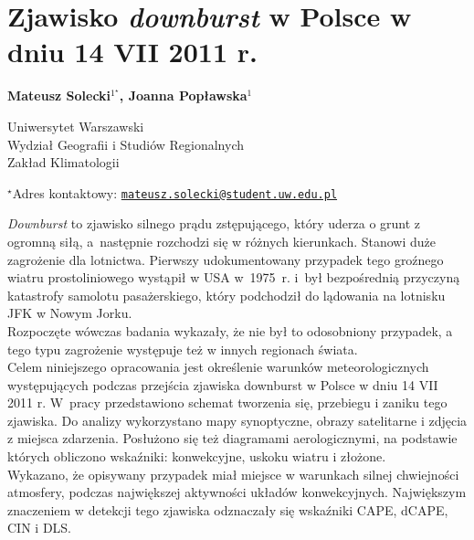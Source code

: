 \documentclass[\main/boa.tex]{subfiles}
\begin{document}
\section{Zjawisko \emph{downburst} w Polsce w dniu 14 VII 2011 r.}

\begin{center}
  {\bf {} Mateusz Solecki$^{1^\star}$,  Joanna Popławska$^{1}$}
\end{center}

\vskip 0.3cm

\begin{affiliations}
\begin{enumerate}
\begin{minipage}{0.915\textwidth}
\centering
\item Uniwersytet Warszawski\\ Wydział Geografii i Studiów Regionalnych\\ Zakład Klimatologii\\[-2pt]
\end{minipage}
\end{enumerate}
$^\star$Adres kontaktowy: \href{mailto:mateusz.solecki@student.uw.edu.pl}{\nolinkurl{mateusz.solecki@student.uw.edu.pl}}\\
\end{affiliations}

\vskip 0.5cm


\vskip 0.5cm

\emph{Downburst} to zjawisko silnego prądu zstępującego, który uderza o grunt z ogromną siłą, a następnie rozchodzi się w różnych kierunkach. Stanowi duże zagrożenie dla lotnictwa. Pierwszy udokumentowany przypadek tego groźnego wiatru prostoliniowego wystąpił 
w USA w 1975 r. i~był bezpośrednią przyczyną katastrofy samolotu pasażerskiego, który podchodził do lądowania na lotnisku JFK w Nowym Jorku. \\
Rozpoczęte wówczas badania wykazały, że nie był to odosobniony przypadek, a tego typu zagrożenie występuje też w innych regionach świata.\\
Celem niniejszego opracowania jest określenie warunków meteorologicznych występujących podczas przejścia zjawiska downburst w Polsce w dniu 14 VII 2011 r. W pracy przedstawiono schemat tworzenia się, przebiegu i zaniku tego zjawiska.  Do analizy wykorzystano mapy synoptyczne, obrazy satelitarne i zdjęcia z miejsca zdarzenia. Posłużono się też diagramami aerologicznymi, na podstawie których obliczono wskaźniki: konwekcyjne, uskoku wiatru i złożone.\\
Wykazano, że opisywany przypadek miał miejsce w warunkach silnej chwiejności atmosfery, podczas największej aktywności układów konwekcyjnych. Największym znaczeniem w detekcji tego zjawiska odznaczały się wskaźniki CAPE, dCAPE, CIN i DLS. 
\end{document}
